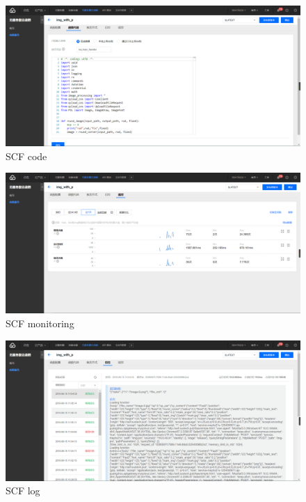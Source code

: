 \documentclass[a4paper,12pt]{article}
\begin{document}
\begin{figure}[H]
\centering
\includegraphics[scale=0.21]{figures/SCF3.png}
\caption{\label{fig:scf3}SCF code}
\end{figure}

\begin{figure}[H]
\centering
\includegraphics[scale=0.21]{figures/SCF4.png}
\caption{\label{fig:scf4}SCF monitoring}
\end{figure}

\begin{figure}[H]
\centering
\includegraphics[scale=0.21]{figures/SCF5.png}
\caption{\label{fig:scf5}SCF log}
\end{figure}
\end{document}
